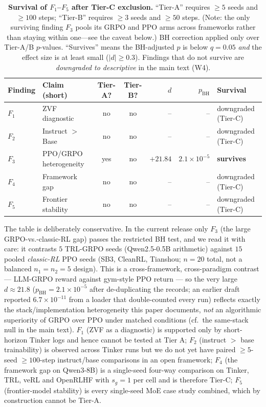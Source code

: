 \begin{table}[ht]
\centering
\caption{\textbf{Survival of $F_1$--$F_5$ after Tier-C exclusion.}
``Tier-A'' requires $\ge 5$ seeds and $\ge 100$ steps; ``Tier-B'' requires
$\ge 3$ seeds and $\ge 50$ steps. (Note: the only surviving finding $F_3$ pools
its GRPO and PPO arms across frameworks rather than staying within one---see the
caveat below.)
BH correction applied only over Tier-A/B $p$-values. ``Survives''
means the BH-adjusted $p$ is below $q{=}0.05$ \emph{and} the effect
size is at least small ($|d| \ge 0.3$). Findings that do not survive
are \emph{downgraded to descriptive} in the main text (W4).}
\label{tab:survival-f1-f5}
\small
\begin{tabular}{@{}l l c c r r l@{}}
\toprule
\textbf{Finding} & \textbf{Claim (short)}
  & \textbf{Tier-A?} & \textbf{Tier-B?}
  & $d$ & $p_{\mathrm{BH}}$ & \textbf{Survival} \\
\midrule
$F_1$ & ZVF diagnostic              & no  & no  & --     & --       & downgraded (Tier-C) \\
$F_2$ & Instruct $>$ Base            & no  & no  & --     & --       & downgraded (Tier-C) \\
$F_3$ & PPO/GRPO heterogeneity       & yes & no  & $+21.84$ & $2.1\times 10^{-5}$ & \textbf{survives} \\
$F_4$ & Framework gap                & no  & no  & --     & --       & downgraded (Tier-C) \\
$F_5$ & Frontier stability           & no  & no  & --     & --       & downgraded (Tier-C) \\
\bottomrule
\end{tabular}
\end{table}

The table is deliberately conservative. In the current release only
$F_3$ (the large GRPO-vs.-classic-RL gap) passes the restricted BH test, and we
read it with care: it contrasts $5$ TRL-GRPO seeds (Qwen2.5-0.5B arithmetic)
against $15$ pooled \emph{classic-RL} PPO seeds (SB3, CleanRL, Tianshou; $n{=}20$
total, not a balanced $n_1{=}n_2{=}5$ design). This is a cross-framework,
cross-paradigm contrast --- LLM-GRPO reward against gym-style PPO return --- so
the very large $d \approx 21.8$ ($p_{\mathrm{BH}}{=}2.1\times10^{-5}$ after
de-duplicating the records; an earlier draft reported $6.7\times10^{-11}$ from a
loader that double-counted every run) reflects exactly the stack/implementation
heterogeneity this paper documents, \emph{not} an algorithmic superiority of
GRPO over PPO under matched conditions (cf.\ the same-stack null in the main
text). $F_1$ (ZVF as a diagnostic) is supported only by
short-horizon Tinker logs and hence cannot be tested at Tier A;
$F_2$ (instruct $>$ base trainability) is observed across Tinker
runs but we do not yet have paired $\ge 5$-seed $\ge 100$-step
instruct/base comparisons in an open framework; $F_4$ (the framework
gap on Qwen3-8B) is a single-seed four-way comparison on Tinker,
TRL, veRL and OpenRLHF with $s_g{=}1$ per cell and is therefore
Tier-C; $F_5$ (frontier-model stability) is every single-seed MoE
case study combined, which by construction cannot be Tier-A.

